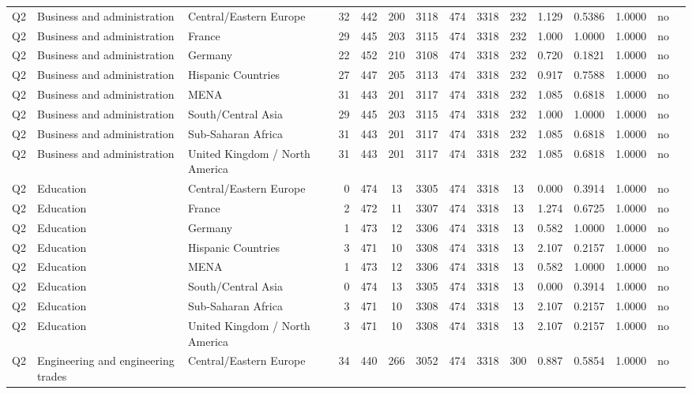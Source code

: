 \begin{longtable}{lllrcccccccccll}
Q2 & Business and administration & Central/Eastern Europe & 32 & 442 & 200 & 3118 & 474 & 3318 & 232 & 1.129 & 0.5386 & 1.0000 & no \\
Q2 & Business and administration & France & 29 & 445 & 203 & 3115 & 474 & 3318 & 232 & 1.000 & 1.0000 & 1.0000 & no \\
Q2 & Business and administration & Germany & 22 & 452 & 210 & 3108 & 474 & 3318 & 232 & 0.720 & 0.1821 & 1.0000 & no \\
Q2 & Business and administration & Hispanic Countries & 27 & 447 & 205 & 3113 & 474 & 3318 & 232 & 0.917 & 0.7588 & 1.0000 & no \\
Q2 & Business and administration & MENA & 31 & 443 & 201 & 3117 & 474 & 3318 & 232 & 1.085 & 0.6818 & 1.0000 & no \\
Q2 & Business and administration & South/Central Asia & 29 & 445 & 203 & 3115 & 474 & 3318 & 232 & 1.000 & 1.0000 & 1.0000 & no \\
Q2 & Business and administration & Sub-Saharan Africa & 31 & 443 & 201 & 3117 & 474 & 3318 & 232 & 1.085 & 0.6818 & 1.0000 & no \\
Q2 & Business and administration & United Kingdom / North America & 31 & 443 & 201 & 3117 & 474 & 3318 & 232 & 1.085 & 0.6818 & 1.0000 & no \\
Q2 & Education & Central/Eastern Europe & 0 & 474 & 13 & 3305 & 474 & 3318 & 13 & 0.000 & 0.3914 & 1.0000 & no \\
Q2 & Education & France & 2 & 472 & 11 & 3307 & 474 & 3318 & 13 & 1.274 & 0.6725 & 1.0000 & no \\
Q2 & Education & Germany & 1 & 473 & 12 & 3306 & 474 & 3318 & 13 & 0.582 & 1.0000 & 1.0000 & no \\
Q2 & Education & Hispanic Countries & 3 & 471 & 10 & 3308 & 474 & 3318 & 13 & 2.107 & 0.2157 & 1.0000 & no \\
Q2 & Education & MENA & 1 & 473 & 12 & 3306 & 474 & 3318 & 13 & 0.582 & 1.0000 & 1.0000 & no \\
Q2 & Education & South/Central Asia & 0 & 474 & 13 & 3305 & 474 & 3318 & 13 & 0.000 & 0.3914 & 1.0000 & no \\
Q2 & Education & Sub-Saharan Africa & 3 & 471 & 10 & 3308 & 474 & 3318 & 13 & 2.107 & 0.2157 & 1.0000 & no \\
Q2 & Education & United Kingdom / North America & 3 & 471 & 10 & 3308 & 474 & 3318 & 13 & 2.107 & 0.2157 & 1.0000 & no \\
Q2 & Engineering and engineering trades & Central/Eastern Europe & 34 & 440 & 266 & 3052 & 474 & 3318 & 300 & 0.887 & 0.5854 & 1.0000 & no \\

\end{longtable}
